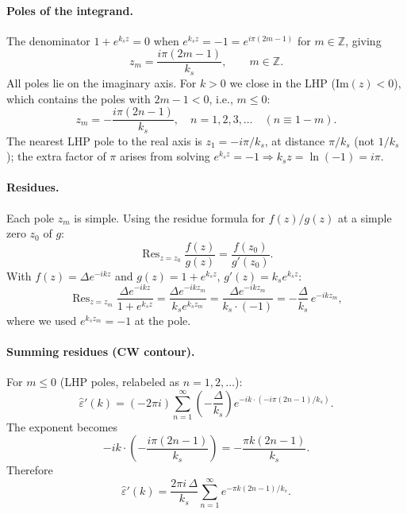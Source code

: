 \documentclass[11pt]{article}
\newcommand{\kk}{k_s}
\newcommand{\eps}{\varepsilon}
\DeclareMathOperator{\Res}{Res}
\begin{document}
\paragraph{Poles of the integrand.}
The denominator $1+e^{\kk z}=0$ when $e^{\kk z} = -1 = e^{i\pi(2m-1)}$
for $m\in\mathbb{Z}$, giving
\begin{equation}\label{eq:log_poles}
    z_m = \frac{i\pi(2m-1)}{\kk}, \qquad m \in \mathbb{Z}.
\end{equation}
All poles lie on the imaginary axis.  For $k>0$ we close in the LHP
($\mathrm{Im}(z)<0$), which contains the poles with $2m-1<0$, i.e.,
$m\leq 0$:
\begin{equation}
    z_m = -\frac{i\pi(2n-1)}{\kk}, \quad n = 1,2,3,\ldots
    \quad (n \equiv 1-m).
\end{equation}
The nearest LHP pole to the real axis is $z_1 = -i\pi/\kk$, at distance
$\pi/\kk$ (not $1/\kk$); the extra factor of $\pi$ arises from solving
$e^{\kk z}=-1 \Rightarrow \kk z = \ln(-1) = i\pi$.

\paragraph{Residues.}
Each pole $z_m$ is simple.  Using the residue formula for $f(z)/g(z)$ at a
simple zero $z_0$ of $g$:
\begin{equation}
    \Res_{z=z_0}\frac{f(z)}{g(z)} = \frac{f(z_0)}{g'(z_0)}.
\end{equation}
With $f(z)=\Delta e^{-ikz}$ and $g(z)=1+e^{\kk z}$, $g'(z)=\kk e^{\kk z}$:
\begin{equation}
    \Res_{z=z_m}\frac{\Delta e^{-ikz}}{1+e^{\kk z}}
    = \frac{\Delta e^{-ikz_m}}{\kk e^{\kk z_m}}
    = \frac{\Delta e^{-ikz_m}}{\kk \cdot (-1)}
    = -\frac{\Delta}{\kk}\,e^{-ikz_m},
\end{equation}
where we used $e^{\kk z_m}=-1$ at the pole.

\paragraph{Summing residues (CW contour).}
For $m \leq 0$ (LHP poles, relabeled as $n=1,2,\ldots$):
\begin{equation}
    \hat{\eps}'(k) = (-2\pi i)
        \sum_{n=1}^{\infty}
        \left(-\frac{\Delta}{\kk}\right)
        e^{-ik\cdot\left(-i\pi(2n-1)/\kk\right)}.
\end{equation}
The exponent becomes
\begin{equation}
    -ik\cdot\left(-\frac{i\pi(2n-1)}{\kk}\right)
    = -\frac{\pi k(2n-1)}{\kk}.
\end{equation}
Therefore
\begin{equation}
    \hat{\eps}'(k) = \frac{2\pi i\,\Delta}{\kk}
        \sum_{n=1}^{\infty} e^{-\pi k(2n-1)/\kk}.
\end{equation}
\end{document}

